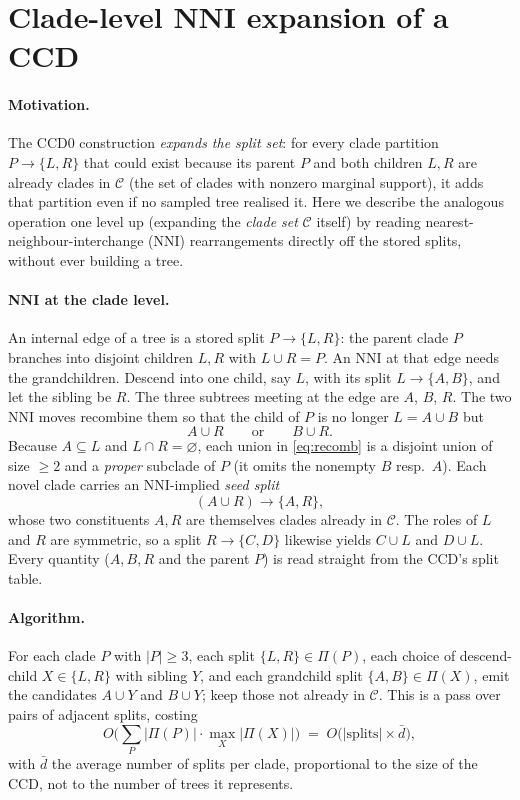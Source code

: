 \documentclass{article}
\newcommand{\CC}{\mathcal{C}}
\newcommand{\union}{\cup}
\begin{document}
\section*{Clade-level NNI expansion of a CCD}

\paragraph{Motivation.}
The CCD0 construction \emph{expands the split set}: for every clade partition
$P\to\{L,R\}$ that could exist because its parent $P$ and both children $L,R$ are
already clades in $\CC$ (the set of clades with nonzero marginal support), it
adds that partition even if no sampled tree realised it. Here we describe the
analogous operation one level up (expanding the \emph{clade set} $\CC$ itself)
by reading nearest-neighbour-interchange (NNI) rearrangements directly off
the stored splits, without ever building a tree.

\paragraph{NNI at the clade level.}
An internal edge of a tree is a stored split $P\to\{L,R\}$: the parent clade $P$
branches into disjoint children $L,R$ with $L\union R=P$. An NNI at that edge
needs the grandchildren. Descend into one child, say $L$, with its split
$L\to\{A,B\}$, and let the sibling be $R$. The three subtrees meeting at the edge
are $A$, $B$, $R$. The two NNI moves recombine them so that the child of $P$ is no
longer $L=A\union B$ but
\begin{equation}
  A\union R \qquad\text{or}\qquad B\union R .
  \label{eq:recomb}
\end{equation}
Because $A\subseteq L$ and $L\cap R=\varnothing$, each union in
\eqref{eq:recomb} is a disjoint union of size $\ge 2$ and a \emph{proper}
subclade of $P$ (it omits the nonempty $B$ resp.\ $A$). Each novel clade carries
an NNI-implied \emph{seed split}
\[
  (A\union R)\to\{A,R\},
\]
whose two constituents $A,R$ are themselves clades already in $\CC$. The roles of
$L$ and $R$ are symmetric, so a split $R\to\{C,D\}$ likewise yields $C\union L$
and $D\union L$. Every quantity ($A,B,R$ and the parent $P$) is read
straight from the CCD's split table.

\paragraph{Algorithm.}
For each clade $P$ with $|P|\ge 3$, each split $\{L,R\}\in\Pi(P)$, each choice of
descend-child $X\in\{L,R\}$ with sibling $Y$, and each grandchild split
$\{A,B\}\in\Pi(X)$, emit the candidates $A\union Y$ and $B\union Y$; keep those
not already in $\CC$. This is a pass over pairs of adjacent splits, costing
\[
  O\!\Big(\textstyle\sum_{P} |\Pi(P)|\cdot \max_{X}|\Pi(X)|\Big)
  \;=\; O\big(|\text{splits}|\times \bar{d}\big),
\]
with $\bar d$ the average number of splits per clade, proportional to the size
of the CCD, not to the number of trees it represents.
\end{document}
